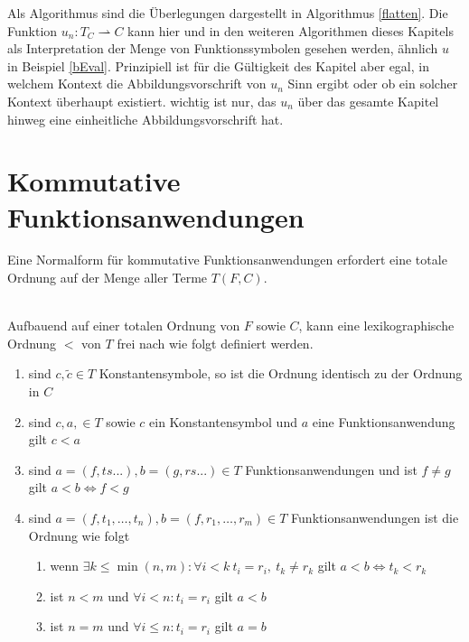Als Algorithmus sind die Überlegungen dargestellt in Algorithmus \ref{flatten}.
Die Funktion $u_n \colon T_C \rightharpoonup C$ kann hier und in den weiteren Algorithmen dieses Kapitels als \grqq{} Interpretation der Menge von Funktionssymbolen gesehen werden, ähnlich $u$ in Beispiel \ref{bEval}. Prinzipiell ist für die Gültigkeit des Kapitel aber egal, in welchem Kontext die Abbildungsvorschrift von $u_n$ Sinn ergibt oder ob ein solcher Kontext überhaupt existiert. wichtig ist nur, das $u_n$ über das gesamte Kapitel hinweg eine einheitliche Abbildungsvorschrift hat.

\begin{algorithm}
\DontPrintSemicolon
\caption{$\mathrm{flatten} \colon T \rightarrow T$}\label{flatten}

\end{algorithm}

\section{Kommutative Funktionsanwendungen} \label{subsecNormalSortieren}
Eine Normalform für kommutative Funktionsanwendungen erfordert eine totale Ordnung auf der Menge aller Terme $T(F, C)$. 

\begin{definition}~\\ \label{defOrdnungKleiner}
Aufbauend auf einer totalen Ordnung von $F$ sowie $C$, kann eine lexikographische Ordnung $<$ von $T$ frei nach \cite{LexikografischeOrdnung} wie folgt definiert werden. 
\begin{enumerate}
	\item{sind $c, \tilde{c} \in T$ Konstantensymbole, so ist die Ordnung identisch zu der Ordnung in $C$}
	\item{sind $c, a, \in T$ sowie $c$ ein Konstantensymbol und $a$ eine Funktionsanwendung gilt $c < a$ }
	\item{sind $a = (f, ts...), b = (g, rs...) \in T$ Funktionsanwendungen und ist $f \neq g$ gilt $a < b \iff f < g $}
	\item{sind $a = (f, t_1, \dots, t_n), b = (f, r_1, \dots, r_m) \in T$ Funktionsanwendungen ist die Ordnung wie folgt}
	\begin{enumerate}
		\item{wenn $\exists k \leq \min{(n, m)} \colon \forall i < k ~ t_i = r_i ,~ t_k \neq r_k $ gilt ${a < b \iff t_k < r_k}$}
		\item{ist $n < m$ und $\forall i < n\colon t_i = r_i$ gilt $a < b$}
		\item{ist $n = m$ und $\forall i \leq n\colon t_i = r_i$ gilt $a = b$}
	\end{enumerate}
\end{enumerate}

\end{definition}


